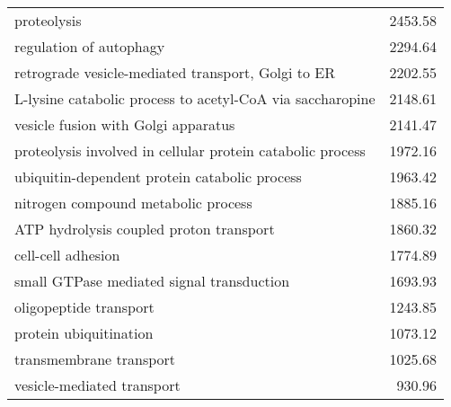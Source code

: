 \begin{table}[h]
\begin{center}
\begin{tabular}{p{}r}
proteolysis                                                   & 2453.58                     \\ %
regulation of autophagy                                       & 2294.64                     \\ %
retrograde vesicle-mediated transport, Golgi to ER            & 2202.55                     \\
L-lysine catabolic process to acetyl-CoA via saccharopine     & 2148.61                     \\
vesicle fusion with Golgi apparatus                           & 2141.47                     \\
proteolysis involved in cellular protein catabolic process    & 1972.16                     \\
ubiquitin-dependent protein catabolic process                 & 1963.42                     \\
nitrogen compound metabolic process                           & 1885.16                     \\ %
ATP hydrolysis coupled proton transport                       & 1860.32                     \\ 
cell-cell adhesion                                            & 1774.89                     \\ %
small GTPase mediated signal transduction                     & 1693.93                     \\
oligopeptide transport                                        & 1243.85                     \\
protein ubiquitination                                        & 1073.12                     \\
transmembrane transport                                       & 1025.68                     \\
vesicle-mediated transport                                    & 930.96                      \\

\end{tabular}
\end{center}
\end{table}
